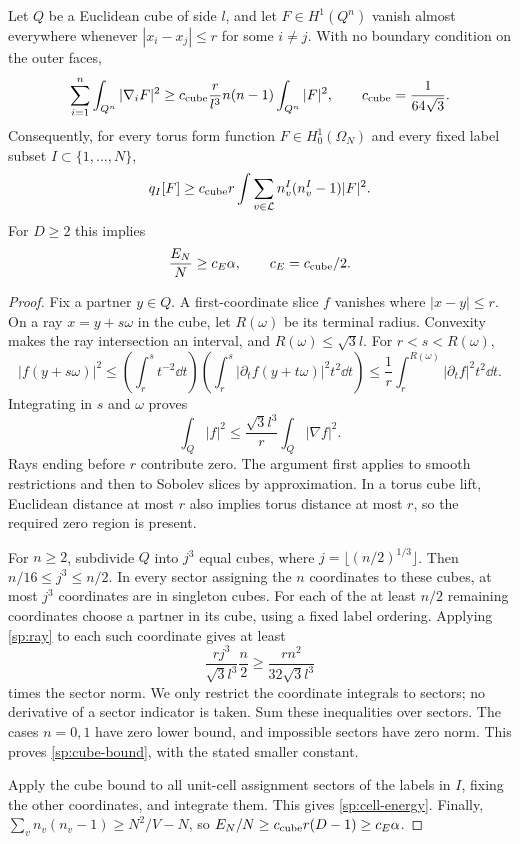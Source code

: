 \begin{lemma}\label{sp:cube}
Let $Q$ be a Euclidean cube of side $l$, and let $F\in H^1(Q^n)$ vanish
almost everywhere whenever $|x_i-x_j|\le r$ for some $i\ne j$.
With no boundary condition on the outer faces,
\begin{equation}\label{sp:cube-bound}
 \sum_{i=1}^n\int_{Q^n}|\nabla_iF|^2
 \ge c_{\rm cube}\frac r{l^3}n(n-1)\int_{Q^n}|F|^2,
 \qquad c_{\rm cube}=\frac1{64\sqrt3}.
\end{equation}
Consequently, for every torus form function $F\in H_0^1(\Omega_N)$
and every fixed label subset $I\subset\{1,\ldots,N\}$,
\begin{equation}\label{sp:cell-energy}
 q_I[F]\ge c_{\rm cube}r\int\sum_{v\in\mathcal L}
                    n_v^I(n_v^I-1)|F|^2.
\end{equation}
For $D\ge2$ this implies
\begin{equation}\label{sp:energy-lower}
 \frac{E_N}{N}\ge c_E\alpha,
 \qquad c_E=c_{\rm cube}/2.
\end{equation}
\end{lemma}

\begin{proof}
Fix a partner $y\in Q$.  A first-coordinate slice $f$ vanishes where
$|x-y|\le r$.  On a ray $x=y+s\omega$ in the cube, let $R(\omega)$
be its terminal radius.  Convexity makes the ray intersection an interval,
and $R(\omega)\le\sqrt3l$.  For $r<s<R(\omega)$,
\[
 |f(y+s\omega)|^2
 \le\left(\int_r^s t^{-2}\dd t\right)
       \left(\int_r^s|\partial_tf(y+t\omega)|^2t^2\dd t\right)
 \le\frac1r\int_r^{R(\omega)}|\partial_tf|^2t^2\dd t.
\]
Integrating in $s$ and $\omega$ proves
\begin{equation}\label{sp:ray}
 \int_Q|f|^2\le\frac{\sqrt3l^3}{r}\int_Q|\nabla f|^2.
\end{equation}
Rays ending before $r$ contribute zero.  The argument first applies to
smooth restrictions and then to Sobolev slices by approximation.  In a
torus cube lift, Euclidean distance at most $r$ also implies torus distance
at most $r$, so the required zero region is present.

For $n\ge2$, subdivide $Q$ into $j^3$ equal cubes, where
$j=\lfloor(n/2)^{1/3}\rfloor$.  Then
$n/16\le j^3\le n/2$.  In every sector assigning the $n$ coordinates
to these cubes, at most $j^3$ coordinates are in singleton cubes.
For each of the at least $n/2$ remaining coordinates choose a partner in
its cube, using a fixed label ordering.  Applying \eqref{sp:ray} to each
such coordinate gives at least
\[
 \frac{rj^3}{\sqrt3l^3}\frac n2
 \ge\frac{rn^2}{32\sqrt3l^3}
\]
times the sector norm.  We only restrict the coordinate integrals to
sectors; no derivative of a sector indicator is taken.  Sum these
inequalities over sectors.  The cases $n=0,1$ have zero lower bound,
and impossible sectors have zero norm.  This proves
\eqref{sp:cube-bound}, with the stated smaller constant.

Apply the cube bound to all unit-cell assignment sectors of the labels
in $I$, fixing the other coordinates, and integrate them.  This gives
\eqref{sp:cell-energy}.  Finally,
$\sum_v n_v(n_v-1)\ge N^2/V-N$, so
$E_N/N\ge c_{\rm cube}r(D-1)\ge c_E\alpha$.
\end{proof}

